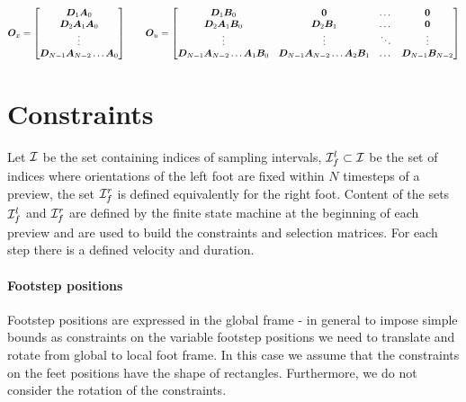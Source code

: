 \documentclass[a4paper]{article}
\begin{document}
\begin{equation}
    \M{O}_{x} =
        \begin{bmatrix}
        \M{D}_1 \M{A}_0    \\
        \M{D}_2 \M{A}_1 \M{A}_0  \\
        \vdots           \\
        \M{D}_{N-1} \M{A}_{N-2} \dots \M{A}_0 \\
        \end{bmatrix}
    \quad\quad
    \M{O}_{u} =
        \begin{bmatrix}
        \M{D}_1 \M{B}_0                     & \M{0}                                 & \dots & \M{0} \\
        \M{D}_2 \M{A}_1 \M{B}_0             & \M{D}_2 \M{B}_1                       & \dots & \M{0} \\
        \vdots                              & \vdots                                & \ddots& \vdots \\
        \M{D}_{N-1} \M{A}_{N-2} \dots \M{A}_1 \M{B}_0   & \M{D}_{N-1} \M{A}_{N-2} \dots \M{A}_2 \M{B}_1     & \dots & \M{D}_{N-1}\M{B}_{N-2} \\
        \end{bmatrix}
\end{equation}

\section*{Constraints}

Let $\mathcal{I}$ be the set containing indices of sampling intervals, $\mathcal{I}^l_f
\subset \mathcal{I}$ be the set of indices where orientations of the left foot are
fixed within $N$ timesteps of a preview, the set $\mathcal{I}^r_f$ is defined equivalently for the right foot. Content of the sets $\mathcal{I}^l_f$ and $\mathcal{I}^r_f$ are defined by the finite state machine at the beginning of
each preview and are used to build the constraints and selection matrices. For each step there is a defined velocity and duration.


\paragraph{Footstep positions}
Footstep positions are expressed in the global frame - in general to impose simple bounds as constraints on the variable footstep positions we need to translate and rotate from global to local foot frame.
In this case we assume that the constraints on the feet positions have the shape of rectangles. Furthermore, we do not consider the rotation of the constraints.\\
\end{document}
